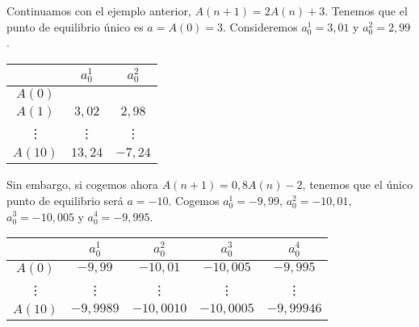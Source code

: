 \begin{eg}
\normalfont Continuamos con el ejemplo anterior, $\displaystyle A\left(n+1\right) = 2A\left(n\right)+3 $. Tenemos que el punto de equilibrio único es $\displaystyle a = A\left(0\right) = 3 $. Consideremos $\displaystyle a_{0}^{1} = 3,01 $ y $\displaystyle a_{0}^{2} = 2,99 $.
\begin{center}
\begin{tabular}{|c|c|c|}
\hline 
& $\displaystyle a_{0}^{1} $ &$ a_{0}^{2} $ \\
\hline 
	$\displaystyle A\left(0\right) $ & & \\
	\hline 
	$\displaystyle A\left(1\right) $ & $\displaystyle 3,02 $ & $\displaystyle 2,98 $ \\
	\hline 
	\vdots & \vdots & \vdots \\
	\hline 
	$\displaystyle A\left(10\right) $ & $\displaystyle 13,24 $ & $\displaystyle -7,24 $ \\
	\hline
\end{tabular}
\end{center}
Sin embargo, si cogemos ahora $\displaystyle A\left(n+1\right) = 0,8A\left(n\right) - 2 $, tenemos que el único punto de equilibrio será $\displaystyle a = - 10 $. Cogemos $\displaystyle a_{0}^{1} = -9,99 $, $\displaystyle a_{0}^{2} = -10,01 $, $\displaystyle a_{0}^{3} = -10,005 $ y $\displaystyle a_{0}^{4} = -9,995 $. 
\begin{center}
\begin{tabular}{|c|c|c|c|c|}
\hline
& $\displaystyle a_{0}^{1} $  & $\displaystyle a_{0}^{2} $ & $\displaystyle a_{0}^{3} $ & $\displaystyle a_{0}^{4} $ \\
\hline
	$\displaystyle A\left(0\right) $ & $\displaystyle -9,99 $ & $\displaystyle -10,01 $ & $\displaystyle -10,005 $ & $\displaystyle -9,995 $ \\
	\hline
	\vdots & \vdots & \vdots & \vdots & \vdots \\
	\hline
	$\displaystyle A\left(10\right) $ & $\displaystyle -9,9989 $ & $\displaystyle -10,0010 $ & $\displaystyle -10,0005 $ & $\displaystyle -9,99946 $ \\
	\hline
\end{tabular}
\end{center}
\end{eg}
